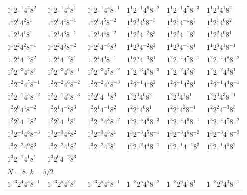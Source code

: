 \documentclass[12pt]{amsart}
\numberwithin{equation}{section}
\theoremstyle{plain}
\theoremstyle{definition}
\theoremstyle{remark}
\begin{document}
\begin{longtable}{llllll}
$1^{1}2^{-1}4^{2}8^{2}$ & $1^{1}2^{-1}4^{3}8^{1}$ & $1^{1}2^{-1}4^{5}8^{-1}$ & $1^{1}2^{-1}4^{6}8^{-2}$ & $1^{1}2^{-1}4^{7}8^{-3}$ & $1^{1}2^{0}4^{1}8^{2}$\\
$1^{1}2^{0}4^{2}8^{1}$ & $1^{1}2^{0}4^{4}8^{-1}$ & $1^{1}2^{0}4^{5}8^{-2}$ & $1^{1}2^{0}4^{6}8^{-3}$ & $1^{1}2^{1}4^{-1}8^{3}$ & $1^{1}2^{1}4^{0}8^{2}$\\
$1^{1}2^{1}4^{1}8^{1}$ & $1^{1}2^{1}4^{3}8^{-1}$ & $1^{1}2^{1}4^{4}8^{-2}$ & $1^{1}2^{2}4^{-2}8^{3}$ & $1^{1}2^{2}4^{-1}8^{2}$ & $1^{1}2^{2}4^{0}8^{1}$\\
$1^{1}2^{2}4^{2}8^{-1}$ & $1^{1}2^{2}4^{3}8^{-2}$ & $1^{1}2^{3}4^{-3}8^{3}$ & $1^{1}2^{3}4^{-2}8^{2}$ & $1^{1}2^{3}4^{-1}8^{1}$ & $1^{1}2^{3}4^{1}8^{-1}$\\
$1^{1}2^{4}4^{-3}8^{2}$ & $1^{1}2^{4}4^{-2}8^{1}$ & $1^{1}2^{4}4^{0}8^{-1}$ & $1^{1}2^{5}4^{-3}8^{1}$ & $1^{2}2^{-4}4^{7}8^{-1}$ & $1^{2}2^{-4}4^{8}8^{-2}$\\
$1^{2}2^{-3}4^{4}8^{1}$ & $1^{2}2^{-3}4^{6}8^{-1}$ & $1^{2}2^{-3}4^{7}8^{-2}$ & $1^{2}2^{-3}4^{8}8^{-3}$ & $1^{2}2^{-2}4^{2}8^{2}$ & $1^{2}2^{-2}4^{3}8^{1}$\\
$1^{2}2^{-2}4^{5}8^{-1}$ & $1^{2}2^{-2}4^{6}8^{-2}$ & $1^{2}2^{-2}4^{7}8^{-3}$ & $1^{2}2^{-1}4^{1}8^{2}$ & $1^{2}2^{-1}4^{2}8^{1}$ & $1^{2}2^{-1}4^{4}8^{-1}$\\
$1^{2}2^{-1}4^{5}8^{-2}$ & $1^{2}2^{-1}4^{6}8^{-3}$ & $1^{2}2^{0}4^{-1}8^{3}$ & $1^{2}2^{0}4^{0}8^{2}$ & $1^{2}2^{0}4^{1}8^{1}$ & $1^{2}2^{0}4^{3}8^{-1}$\\
$1^{2}2^{0}4^{4}8^{-2}$ & $1^{2}2^{1}4^{-2}8^{3}$ & $1^{2}2^{1}4^{-1}8^{2}$ & $1^{2}2^{1}4^{0}8^{1}$ & $1^{2}2^{1}4^{2}8^{-1}$ & $1^{2}2^{2}4^{-3}8^{3}$\\
$1^{2}2^{2}4^{-2}8^{2}$ & $1^{2}2^{2}4^{-1}8^{1}$ & $1^{3}2^{-5}4^{8}8^{-2}$ & $1^{3}2^{-5}4^{9}8^{-3}$ & $1^{3}2^{-4}4^{6}8^{-1}$ & $1^{3}2^{-4}4^{7}8^{-2}$\\
$1^{3}2^{-4}4^{8}8^{-3}$ & $1^{3}2^{-3}4^{2}8^{2}$ & $1^{3}2^{-3}4^{3}8^{1}$ & $1^{3}2^{-3}4^{5}8^{-1}$ & $1^{3}2^{-3}4^{6}8^{-2}$ & $1^{3}2^{-3}4^{7}8^{-3}$\\
$1^{3}2^{-2}4^{0}8^{3}$ & $1^{3}2^{-2}4^{1}8^{2}$ & $1^{3}2^{-2}4^{2}8^{1}$ & $1^{3}2^{-2}4^{4}8^{-1}$ & $1^{3}2^{-1}4^{-1}8^{3}$ & $1^{3}2^{-1}4^{0}8^{2}$\\
$1^{3}2^{-1}4^{1}8^{1}$ & $1^{3}2^{0}4^{-2}8^{3}$ & &&&\\
\midrule
\multicolumn{6}{l}{$N=8$, $k=5/2$}\\
$1^{-3}2^{4}4^{5}8^{-1}$ & $1^{-3}2^{5}4^{2}8^{1}$ & $1^{-3}2^{5}4^{4}8^{-1}$ & $1^{-3}2^{5}4^{5}8^{-2}$ & $1^{-3}2^{6}4^{1}8^{1}$ & $1^{-3}2^{6}4^{3}8^{-1}$\\

\end{longtable}
\end{document}
